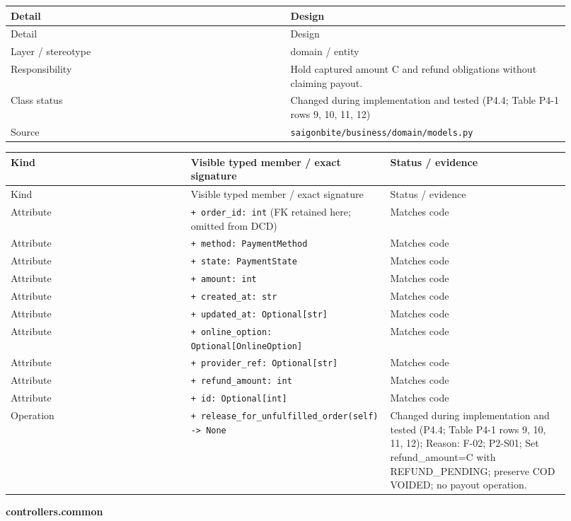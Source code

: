 \begin{longtable}{>{\raggedright\arraybackslash}p{0.4600\linewidth}>{\raggedright\arraybackslash}p{0.4600\linewidth}}
Detail & Design \\
\hline\endfirsthead
Detail & Design \\
\hline\endhead
Layer / stereotype & domain / \guillemotleft{}entity\guillemotright{} \\
Responsibility & Hold captured amount C and refund obligations without claiming payout. \\
Class status & Changed during implementation and tested (P4.4; Table P4-1 rows 9, 10, 11, 12) \\
Source & \texttt{saigonbite/\allowbreak{}business/\allowbreak{}domain/\allowbreak{}models.\allowbreak{}py} \\
\end{longtable}
\begin{longtable}{>{\raggedright\arraybackslash}p{0.3067\linewidth}>{\raggedright\arraybackslash}p{0.3067\linewidth}>{\raggedright\arraybackslash}p{0.3067\linewidth}}
Kind & Visible typed member / exact signature & Status / evidence \\
\hline\endfirsthead
Kind & Visible typed member / exact signature & Status / evidence \\
\hline\endhead
Attribute & \texttt{+ order\_\allowbreak{}id: int} (FK retained here; omitted from DCD) & Matches code \\
Attribute & \texttt{+ method: PaymentMethod} & Matches code \\
Attribute & \texttt{+ state: PaymentState} & Matches code \\
Attribute & \texttt{+ amount: int} & Matches code \\
Attribute & \texttt{+ created\_\allowbreak{}at: str} & Matches code \\
Attribute & \texttt{+ updated\_\allowbreak{}at: Optional[str]} & Matches code \\
Attribute & \texttt{+ online\_\allowbreak{}option: Optional[OnlineOption]} & Matches code \\
Attribute & \texttt{+ provider\_\allowbreak{}ref: Optional[str]} & Matches code \\
Attribute & \texttt{+ refund\_\allowbreak{}amount: int} & Matches code \\
Attribute & \texttt{+ id: Optional[int]} & Matches code \\
Operation & \texttt{+ release\_\allowbreak{}for\_\allowbreak{}unfulfilled\_\allowbreak{}order(self) -\textgreater{} None} & Changed during implementation and tested (P4.4; Table P4-1 rows 9, 10, 11, 12); Reason: F-02; P2-S01; Set refund\_amount=C with REFUND\_PENDING; preserve COD VOIDED; no payout operation. \\
\end{longtable}
\textbf{controllers.common}

